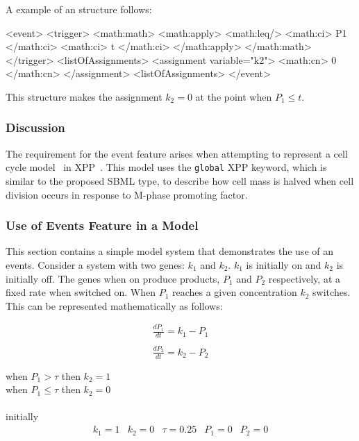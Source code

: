 \documentclass[10pt,twocolumntoc]{cekarticle}
\begin{document}
A example of an  structure follows:

\begin{example}
<event>
    <trigger>
        <math:math>
            <math:apply>
                <math:leq/>
                <math:ci> P1 </math:ci>
                <math:ci> t </math:ci>
            </math:apply>
        </math:math>
    </trigger>
    <listOfAssignments>
        <assignment variable="k2">
            <math:cn> 0 </math:cn>
        </assignment>
    <listOfAssignments>
</event>
\end{example}

This structure makes the assignment $k_2 = 0$ at the point when
$P_1 \leq t$.

\subsubsection{Discussion}
\label{sec:eventdiscuss}
The requirement for the event feature arises when attempting to represent a cell cycle model~\citep{novak:2001} in XPP~\citep{ermentrout:2001}.  This model uses the \texttt{global} XPP keyword, which is similar to the proposed SBML  type, to describe how cell mass is halved when cell division occurs in response to M-phase promoting factor.
\subsubsection{Use of Events Feature in a Model}
\label{sec:eventeg}
This section contains a simple model system that demonstrates the
use of an events.  Consider a system with two genes: $k_1$ and
$k_2$.  $k_1$ is initially on and $k_2$ is initially off.  The
genes when on produce products, $P_1$ and $P_2$ respectively, at a
fixed rate when switched on.  When $P_1$ reaches a given
concentration $k_2$ switches.  This can be represented
mathematically as follows:

\begin{equation*}
  \begin{array}{l}
    \frac{d P_1}{d t} = k_1 - P_1\\ \\[-4pt]
    \frac{d P_2}{d t} = k_2 - P_2\\ \\[-4pt]
  \end{array}
\end{equation*}
when $P_1 > \tau$ then $k_2 = 1$ \\
when $P_1 \leq \tau$ then $k_2 = 0$ \\
\\
initially
\begin{equation*}
  \begin{array}{lllll}
    k_1 = 1 & k_2 = 0 & \tau = 0.25 & P_1 = 0 & P_2 = 0\\ \\[-4pt]
  \end{array}
\end{equation*}
\end{document}
